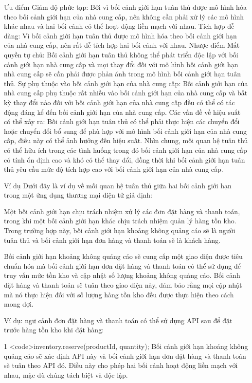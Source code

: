 Ưu điểm
Giảm độ phức tạp: Bởi vì bối cảnh giới hạn tuân thủ được mô hình hóa theo bối cảnh giới hạn của nhà cung cấp, nên không cần phải xử lý các mô hình khác nhau và hai bối cảnh có thể hoạt động liền mạch với nhau.
Tích hợp dễ dàng: Vì bối cảnh giới hạn tuân thủ được mô hình hóa theo bối cảnh giới hạn của nhà cung cấp, nên rất dễ tích hợp hai bối cảnh với nhau.
Nhược điểm
Mất quyền tự chủ: Bối cảnh giới hạn tuân thủ không thể phát triển độc lập với bối cảnh giới hạn nhà cung cấp và mọi thay đổi đối với mô hình bối cảnh giới hạn nhà cung cấp sẽ cần phải được phản ánh trong mô hình bối cảnh giới hạn tuân thủ.
Sự phụ thuộc vào bối cảnh giới hạn của nhà cung cấp: Bối cảnh giới hạn của nhà cung cấp phụ thuộc rất nhiều vào bối cảnh giới hạn của nhà cung cấp và bất kỳ thay đổi nào đối với bối cảnh giới hạn của nhà cung cấp đều có thể có tác động đáng kể đến bối cảnh giới hạn của nhà cung cấp.
Các vấn đề về hiệu suất có thể xảy ra: Bối cảnh giới hạn tuân thủ có thể phải thực hiện các chuyển đổi hoặc chuyển đổi bổ sung để phù hợp với mô hình bối cảnh giới hạn của nhà cung cấp, điều này có thể ảnh hưởng đến hiệu suất.
Nhìn chung, mối quan hệ tuân thủ có thể hữu ích trong các tình huống trong đó bối cảnh giới hạn của nhà cung cấp có tính ổn định cao và khó có thể thay đổi, đồng thời khi bối cảnh giới hạn tuân thủ yêu cầu mức độ tích hợp cao với bối cảnh giới hạn của nhà cung cấp.

Ví dụ
Dưới đây là ví dụ về mối quan hệ tuân thủ giữa hai bối cảnh giới hạn trong một ứng dụng thương mại điện tử giả định:

Một bối cảnh giới hạn chịu trách nhiệm xử lý các đơn đặt hàng và thanh toán, trong khi một bối cảnh giới hạn khác chịu trách nhiệm quản lý hàng tồn kho. Trong trường hợp này, bối cảnh giới hạn khoảng không quảng cáo sẽ là người tuân thủ và bối cảnh giới hạn đơn hàng và thanh toán sẽ là khách hàng.

Bối cảnh giới hạn khoảng không quảng cáo sẽ cung cấp một giao diện được tiêu chuẩn hóa mà bối cảnh giới hạn đơn đặt hàng và thanh toán có thể sử dụng để truy vấn mức tồn kho và cập nhật số lượng khoảng không quảng cáo. Bối cảnh đặt hàng và thanh toán sẽ tuân theo giao diện này, đảm bảo rằng mọi cập nhật mà nó thực hiện đối với số lượng hàng tồn kho đều được thực hiện theo cách mong đợi.

Ví dụ: ngữ cảnh đơn đặt hàng và thanh toán có thể sử dụng API sau để đặt trước hàng tồn kho khi đặt hàng:

1
<code>inventory.reserve(productId, quantity);
Bối cảnh giới hạn khoảng không quảng cáo sẽ xác định API này và bối cảnh giới hạn đơn đặt hàng và thanh toán sẽ tuân theo API đó. Điều này cho phép hai bối cảnh hoạt động liền mạch với nhau, mặc dù chúng tách biệt và độc lập.

